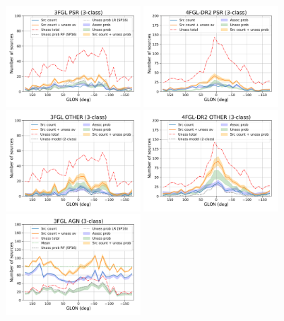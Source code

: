 \begin{figure}[h]
\centering
\includegraphics[width=0.45\textwidth]{plots/lon_profile_PSR_3FGL_3classes.pdf}
\includegraphics[width=0.45\textwidth]{plots/lon_profile_PSR_4FGL-DR2_3classes.pdf} \\
\includegraphics[width=0.45\textwidth]{plots/lon_profile_OTHER_3FGL_3classes.pdf}
\includegraphics[width=0.45\textwidth]{plots/lon_profile_OTHER_4FGL-DR2_3classes.pdf} \\
\includegraphics[width=0.45\textwidth]{plots/lon_profile_AGN_3FGL_3classes.pdf}

\end{figure}
